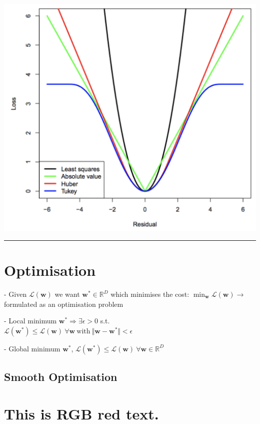 \documentclass[10pt]{article}
\begin{document}
\begin{multicols*}{4}
\includegraphics[width=\linewidth]{loss_functions.png}

\vspace{4pt}
\hrule
\vspace{4pt}
\section{Optimisation}

- Given $\mathcal{L}(\mathbf{w})$ we want $\mathbf{w^*} \in \mathbb{R}^D$ which minimises the cost: $\min_\mathbf{w} \mathcal{L}(\mathbf{w}) \rightarrow$ formulated as an optimisation problem

- Local minimum $\mathbf{w^*} \Rightarrow \exists \epsilon > 0$ s.t. \\
$\mathcal{L}(\mathbf{w^*}) \leq \mathcal{L}(\mathbf{w}) \ \forall \mathbf{w} \ \mathrm{with} \ \Vert \mathbf{w}-\mathbf{w^*} \Vert < \epsilon$

- Global minimum $\mathbf{w^*}$,
$\mathcal{L}(\mathbf{w^*}) \leq \mathcal{L}(\mathbf{w}) \ \forall \mathbf{w} \in \mathbb{R}^D$

\subsection{Smooth Optimisation}



\newpage
\section{{\textcolor[RGB]{255,0,0}{This is RGB red text.}}}


\end{multicols*}
\end{document}
